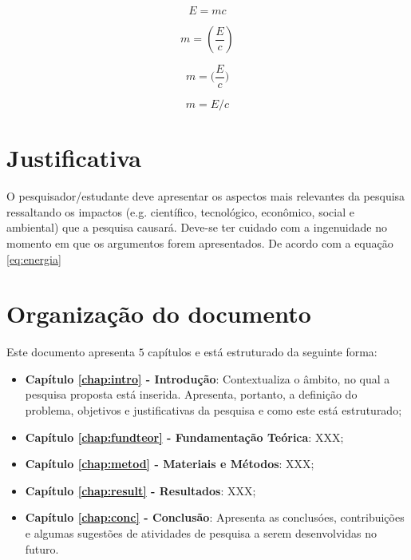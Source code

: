 \begin{equation}
\label{eq:energia}
  E=mc
\end{equation}


\begin{equation*}
  m=(\frac{E}{c})
\end{equation*}


\begin{equation*}
  m=\Bigg(\frac{E}{c}\Bigg)
\end{equation*}


\begin{equation}
  m=E/c
\end{equation}


\section{Justificativa}
\label{sec:justi}

O pesquisador/estudante deve apresentar os aspectos mais
relevantes da pesquisa ressaltando os impactos (e.g. cient\'ifico,
tecnol\'ogico, econ\^omico, social e ambiental) que a pesquisa
causar\'a. Deve-se ter cuidado com a ingenuidade no momento em que
os argumentos forem apresentados.
De acordo com a equação \ref{eq:energia}




\section{Organização do documento}
\label{section:organizacao}

Este documento apresenta $5$ capítulos e está estruturado da seguinte forma:

\begin{itemize}

  \item \textbf{Capítulo \ref{chap:intro} - Introdução}: Contextualiza o âmbito, no qual a pesquisa proposta está inserida. Apresenta, portanto, a definição do problema, objetivos e justificativas da pesquisa e como este \thetypeworkthree está estruturado;
  \item \textbf{Capítulo \ref{chap:fundteor} - Fundamentação Teórica}: XXX;
  \item \textbf{Capítulo \ref{chap:metod} - Materiais e Métodos}: XXX;
  \item \textbf{Capítulo \ref{chap:result} - Resultados}: XXX;
  \item \textbf{Capítulo \ref{chap:conc} - Conclusão}: Apresenta as conclusóes, contribuições e algumas sugestões de atividades de pesquisa a serem desenvolvidas no futuro.

\end{itemize}
